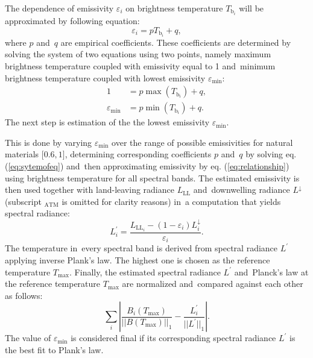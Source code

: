 The dependence of emissivity $ {\varepsilon_i}$ on brightness temperature $ {T_{\mathrm{b}_i}}$ will be approximated by following equation:
\begin{equation} \varepsilon_{ {i}} =  {p} T_{\mathrm{b}_{ {i}}} +  {q}, \label{eq:relationship}\end{equation}
where $ {p}$ and~$ {q}$ are empirical coefficients. These coefficients are determined by solving the system of two equations using two points, namely maximum brightness temperature coupled with emissivity equal to 1 and~minimum brightness temperature coupled with lowest emissivity $\varepsilon_\mathrm{min}$:
\begin{equation}
\begin{aligned}
	1 &=  {p} \max (T_{\mathrm{b}_{ {i}}}) +  {q}, \\
	\varepsilon_\mathrm{min} &=  {p} \min (T_{\mathrm{b}_{ {i}}}) +  {q}.
\end{aligned}
\label{eq:sytemofeq}
\end{equation}
The next step is estimation of the the lowest emissivity $\varepsilon_\mathrm{min}$.

This is done by varying $\varepsilon_\mathrm{min}$ over the range  {of possible emissivities for natural materials $[0.6,1{ {]}}$}, determining corresponding coefficients $ {p}$ and~$ {q}$ by solving eq. (\ref{eq:sytemofeq}) and~then approximating emissivity by eq. (\ref{eq:relationship}) using brightness temperature for all spectral bands. The estimated emissivity is then used together with land-leaving radiance $L_\mathrm{LL}$ and~downwelling radiance $L^\downarrow$ (subscript $_\mathrm{ATM}$ is omitted for clarity reasons) in~a computation that yields spectral radiance:
\begin{equation}
	L^{\prime}_{ {i}} = \frac{L_{\mathrm{LL}_{ {i}}}-(1-\varepsilon_{ {i}})L^\downarrow_{ {i}}}{\varepsilon_{ {i}}}.
	\label{eq:lprime}
\end{equation}
The temperature in~every spectral band is derived from spectral radiance $L^{\prime}$ applying inverse Plank's law. The highest one is chosen as the reference temperature $T_\mathrm{max}$. Finally, the estimated spectral radiance $L^{\prime}$ and~Planck's law at the reference temperature $T_\mathrm{max}$ are normalized and~compared against each other as follows:
\begin{equation*}
	\sum_{ {i}} \left| \frac{B_{ {i}}(T_\mathrm{max})}{||B(T_\mathrm{max})||_1} - \frac{L^\prime_{ {i}}}{||L^\prime||_1} \right|.
\end{equation*}
The value of $\varepsilon_\mathrm{min}$ is considered final if its corresponding spectral radiance $L^{\prime}$  {is the best fit to Plank's law}.

